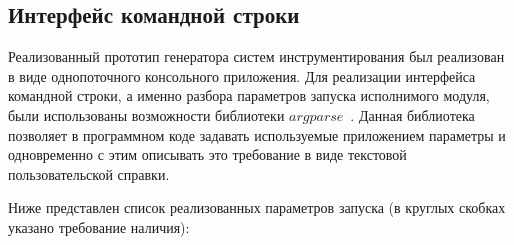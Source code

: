 \subsection{Интерфейс командной строки}

Реализованный прототип генератора систем инструментирования был реализован в виде однопоточного консольного приложения.
Для реализации интерфейса командной строки, а именно разбора параметров запуска исполнимого модуля, были использованы возможности библиотеки $argparse$~\cite{argparse}.
Данная библиотека позволяет в программном коде задавать используемые приложением параметры и одновременно с этим описывать это требование в виде текстовой пользовательской справки.

Ниже представлен список реализованных параметров запуска (в круглых скобках указано требование наличия):

